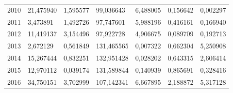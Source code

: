 \begin{table}
\begin{tabular}{p{1cm}p{2cm}p{2cm}p{2cm}p{2cm}p{2cm}p{2cm}}
 2010 &                                    21,475940 &                        1,595577 &                      99,036643 &                    6,488005 &      0,156642 &          0,002297 \\
 2011 &                                     3,473891 &                        1,492726 &                      97,747601 &                    5,988196 &      0,416161 &          0,166940 \\
 2012 &                                    11,419137 &                        3,154496 &                      97,922728 &                    4,906675 &      0,089709 &          0,192713 \\
 2013 &                                     2,672129 &                        0,561849 &                     131,465565 &                    0,007322 &      0,662304 &          5,250908 \\
 2014 &                                    15,267444 &                        0,832251 &                     132,951428 &                    0,028202 &      0,643315 &          2,606414 \\
 2015 &                                    12,970112 &                        0,039174 &                     131,589844 &                    0,140939 &      0,865691 &          0,328416 \\
 2016 &                                    34,750151 &                        3,702999 &                     107,142341 &                    6,667895 &      2,188872 &          5,317128 \\
\bottomrule
\end{tabular}
\end{table}
